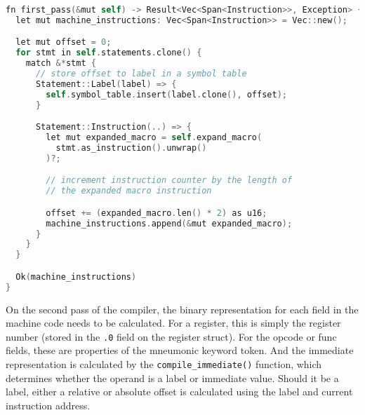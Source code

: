 \begin{lstlisting}[language=C]
fn first_pass(&mut self) -> Result<Vec<Span<Instruction>>, Exception> {
  let mut machine_instructions: Vec<Span<Instruction>> = Vec::new();

  let mut offset = 0;
  for stmt in self.statements.clone() {
    match &*stmt {
      // store offset to label in a symbol table
      Statement::Label(label) => {
        self.symbol_table.insert(label.clone(), offset);
      }

      Statement::Instruction(..) => {
        let mut expanded_macro = self.expand_macro(
          stmt.as_instruction().unwrap()
        )?;

        // increment instruction counter by the length of 
        // the expanded macro instruction

        offset += (expanded_macro.len() * 2) as u16;
        machine_instructions.append(&mut expanded_macro);
      }
    }
  }

  Ok(machine_instructions)
}
\end{lstlisting}

On the second pass of the compiler, the binary representation for each field in the machine code needs to be calculated. For a register, this is simply the register number (stored in the \texttt{.0} field on the register struct). For the opcode or func fields, these are properties of the mneumonic keyword token. And the immediate representation is calculated by the \texttt{compile\_immediate()} function, which determines whether the operand is a label or immediate value. Should it be a label, either a relative or absolute offset is calculated using the label and current instruction address.

